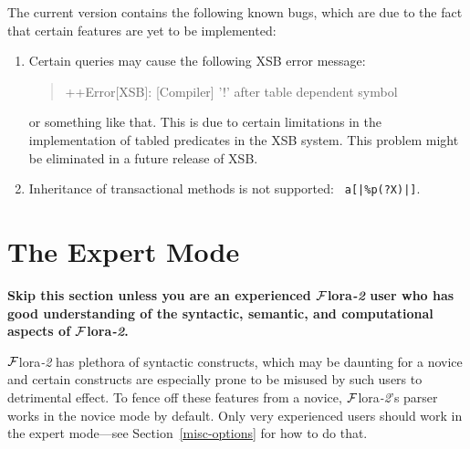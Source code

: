 \documentclass[11pt]{article}
\newcommand{\FLORA}{{\mbox{\sc ${\cal F}${lora}\rm\emph{-2}}}\xspace}
\newcommand{\FLSYSTEM}{\FLORA}
\begin{document}
The current version contains the following known bugs, which are due to the
fact that certain features are yet to be implemented:
\begin{enumerate}
  \item  Certain queries may cause the following XSB error message:
    \begin{quote}
     ++Error[XSB]: [Compiler] '!' after table dependent symbol 
    \end{quote}
    or something like that.
    This is due to certain limitations in the implementation of tabled
    predicates in the XSB system. This problem might be eliminated in a
    future release of XSB.
  \item Inheritance of transactional methods is not supported: {\tt
      a[|\%p(?X)|]}.
\end{enumerate}

\section{The Expert Mode}\label{sec-expert}

\textbf{Skip this section unless you are an experienced \FLSYSTEM user who
  has good understanding of the syntactic, semantic, and computational
  aspects of \FLSYSTEM.}

\FLSYSTEM has plethora of syntactic constructs, which may be daunting
for a novice and certain constructs are especially prone
to be misused by such users to detrimental effect.
To fence off these features from a novice, \FLSYSTEM's parser works in the
novice mode by default. Only very experienced users should work in the
expert mode---see Section~\ref{misc-options} for how to do that.
\end{document}
